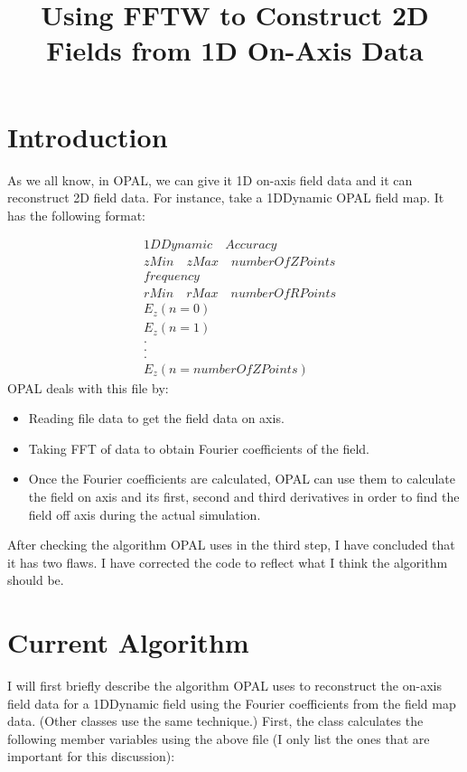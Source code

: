 \documentclass{report}
\begin{document}
\title{Using FFTW to Construct 2D Fields from 1D On-Axis Data}
\maketitle

\section{Introduction}
As we all know, in OPAL, we can give it 1D on-axis field data and it can reconstruct 2D field data. For instance,
take a 1DDynamic OPAL field map. It has the following format:

\begin{equation*}
  \begin{aligned}
    &1DDynamic \quad Accuracy \\
    &zMin \quad zMax \quad numberOfZPoints \\
    &frequency \\
    &rMin \quad rMax \quad numberOfRPoints \\
    &E_{z}(n=0) \\
    &E_{z}(n=1) \\
    &. \\
    &. \\
    &. \\
    &E_{z}(n=numberOfZPoints)
  \end{aligned}
\end{equation*}
OPAL deals with this file by:
\begin{itemize}
\item Reading file data to get the field data on axis.
\item Taking FFT of data to obtain Fourier coefficients of the field.
\item Once the Fourier coefficients are calculated, OPAL can use them to calculate the field on axis and its first,
  second and third derivatives in order to find the field off axis during the actual simulation.
\end{itemize}
After checking the algorithm OPAL uses in the third step, I have concluded that it has two flaws. I have corrected the
code to reflect what I think the algorithm should be.

\section{Current Algorithm}
I will first briefly describe the algorithm OPAL uses to reconstruct the on-axis field data for a 1DDynamic field using the Fourier
coefficients from the field map data. (Other classes use the same technique.) First, the class calculates the following member
variables using the above file (I only list the ones that are important for this discussion):
\end{document}
